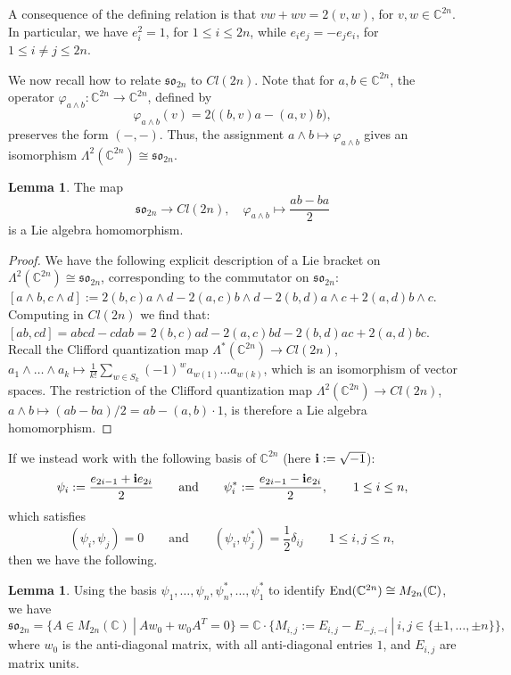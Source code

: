 \documentclass[10pt]{amsart}
\numberwithin{equation}{section}
\theoremstyle{definition}
\newtheorem{lemma}[theorem]{Lemma}
\newcommand{\End}{{\rm End}}
\def\C{{\mathbb C}}
\newcommand{\son}[1][2n]{\mathfrak{so}_{#1}}
\begin{document}
A consequence of the defining relation is that $vw+wv = 2(v,w)$, for $v,w\in \C^{2n}$. In particular, we have $e_i^2=1$, for $1\le i\le 2n$, while $e_ie_j=-e_je_i$, for $1\le i\ne j\le 2n$. 

We now recall how to relate $\son[2n]$ to $Cl(2n)$. Note that for $a,b\in \C^{2n}$, the operator $\varphi_{a\wedge b}:\C^{2n}\rightarrow \C^{2n}$, defined by 
\begin{equation}\label{eq:varphisubab}
\varphi_{a\wedge b}(v) = 2\Big((b,v)a - (a,v)b\Big),
\end{equation}
preserves the form $(-,-)$. Thus, the assignment $a\wedge b\mapsto \varphi_{a \wedge b}$ gives an isomorphism $\Lambda^2(\C^{2n})\cong \son[2n]$.


\begin{lemma}
    The map 
    \[
    \son[2n]\rightarrow Cl(2n), \quad \varphi_{a\wedge b}\mapsto \frac{ab-ba}{2}
    \]
    is a Lie algebra homomorphism.
\end{lemma}
\begin{proof}
We have the following explicit description of a Lie bracket on $\Lambda^2(\C^{2n})\cong \son$, corresponding to the commutator on $\mathfrak{so}_{2n}$: $[a\wedge b, c\wedge d] := 2(b,c)a\wedge d -2(a,c)b\wedge d - 2(b,d)a\wedge c +2(a,d)b\wedge c$. Computing in $Cl(2n)$ we find that: $[ab,cd] = abcd-cdab = 2(b,c)ad -2(a,c)bd - 2(b,d)ac +2(a,d)bc$. Recall the Clifford quantization map $\Lambda^*(\C^{2n})\rightarrow Cl(2n)$, $a_1\wedge \dots \wedge a_k\mapsto \frac{1}{k!}\sum_{w\in S_k}(-1)^wa_{w(1)}\dots a_{w(k)}$, which is an isomorphism of vector spaces. The restriction of the Clifford quantization map $\Lambda^2(\C^{2n})\rightarrow Cl(2n)$, $
a\wedge b\mapsto (ab-ba)/2=ab-(a,b)\cdot 1$, 
is therefore a Lie algebra homomorphism.
\end{proof}

If we instead work with the following basis of $\C^{2n}$ (here ${\bf i}:=\sqrt{-1}$):
\[
\psi_i:= \frac{e_{2i-1}+{\bf i}e_{2i}}{2} \qquad \text{and} \qquad \psi_i^*:= \frac{e_{2i-1}-{\bf i}e_{2i}}{2}, \qquad 1\le i\le n,
\]
which satisfies
\begin{equation}\label{eq:pairingpsi}
(\psi_i,\psi_j)= 0 \qquad \text{and} \qquad (\psi_i,\psi_j^*) = \frac{1}{2}\delta_{ij} \qquad 1\le i,j\le n, 
\end{equation}
then we have the following. 

\begin{lemma}
    Using the basis $\psi_1, \dots, \psi_n, \psi_n^*, \dots, \psi_1^*$ to identify $\End(\C^{2n})\cong M_{2n}(\C)$, we have
    \[
    \son = \{A\in M_{2n}(\C) \ | \ Aw_0+w_0A^T=0\} = \C\cdot\{M_{i,j}:=E_{i,j}-E_{-j,-i} \ | \ i,j\in \{\pm 1, \dots, \pm n\}\},
    \]
    where $w_0$ is the anti-diagonal matrix, with all anti-diagonal entries $1$, and $E_{i,j}$ are matrix units.
\end{lemma} 
\end{document}
